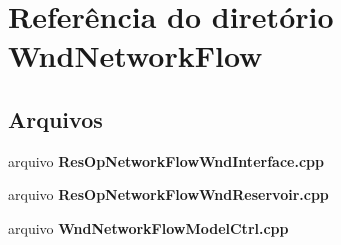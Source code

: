 \section{Referência do diretório Wnd\+Network\+Flow}
\label{dir_64259be068b7679a7c3c5d4e73c193ab}
\subsection*{Arquivos}
\begin{DoxyCompactItemize}
\item 
arquivo {\bf Res\+Op\+Network\+Flow\+Wnd\+Interface.\+cpp}
\item 
arquivo {\bf Res\+Op\+Network\+Flow\+Wnd\+Reservoir.\+cpp}
\item 
arquivo {\bf Wnd\+Network\+Flow\+Model\+Ctrl.\+cpp}
\end{DoxyCompactItemize}
